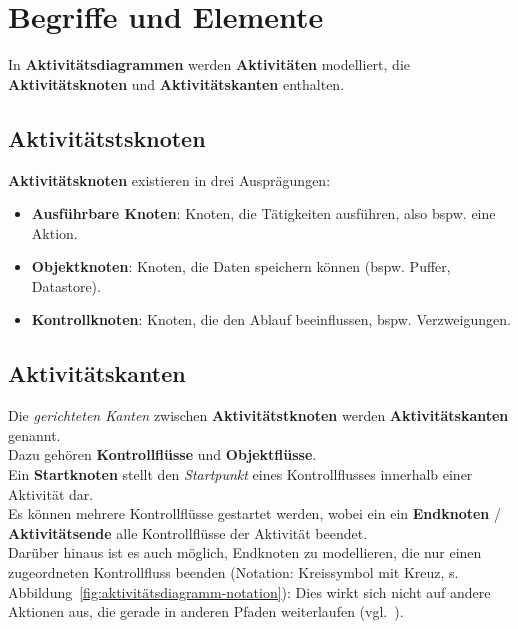 \section{Begriffe und Elemente}\label{sec:aktivitaetsdiagramme-begriffe-und-elemente}

In \textbf{Aktivitätsdiagrammen} werden \textbf{Aktivitäten} modelliert, die \textbf{Aktivitätsknoten} und \textbf{Aktivitätskanten} enthalten.

\subsection{Aktivitätstsknoten}

\textbf{Aktivitätsknoten} existieren in drei Ausprägungen:

\begin{itemize}
    \item \textbf{Ausführbare Knoten}: Knoten, die Tätigkeiten ausführen, also bspw. eine Aktion.
    \item \textbf{Objektknoten}: Knoten, die Daten speichern können (bspw. Puffer, Datastore).
    \item \textbf{Kontrollknoten}: Knoten, die den Ablauf beeinflussen, bspw. Verzweigungen.
\end{itemize}

\subsection{Aktivitätskanten}
Die \textit{gerichteten Kanten} zwischen \textbf{Aktivitätstknoten}  werden \textbf{Aktivitätskanten} genannt.\\
Dazu gehören \textbf{Kontrollflüsse} und \textbf{Objektflüsse}.\\

\noindent
Ein \textbf{Startknoten} stellt den \textit{Startpunkt} eines Kontrollflusses innerhalb einer Aktivität dar.\\
Es können mehrere Kontrollflüsse gestartet werden, wobei ein ein \textbf{Endknoten} / \textbf{Aktivitätsende} alle Kontrollflüsse der Aktivität beendet.\\

Darüber hinaus ist es auch möglich, Endknoten zu modellieren, die nur einen zugeordneten Kontrollfluss beenden (Notation: Kreissymbol mit Kreuz, s. Abbildung~\ref{fig:aktivitätsdiagramm-notation}): Dies wirkt sich nicht auf andere Aktionen aus, die gerade in anderen Pfaden weiterlaufen (vgl.~\cite[72]{Bal05}).\\

